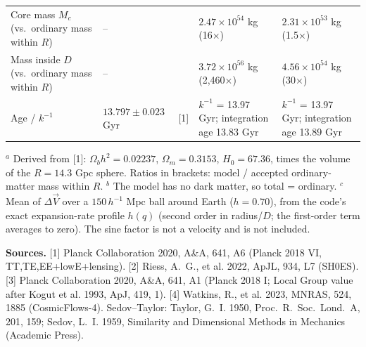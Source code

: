 \documentclass[10pt]{article}
\begin{document}
{\begin{center}
\begin{tabular}{>{\raggedright\arraybackslash}p{4.4cm}>{\raggedright\arraybackslash}p{4.1cm}l>{\raggedright\arraybackslash}p{4.25cm}>{\raggedright\arraybackslash}p{4.25cm}}
Core mass $M_c$ (vs.\ ordinary mass within $R$) & -- &  & $2.47{\times}10^{54}$ kg (16$\times$) & $2.31{\times}10^{53}$ kg (1.5$\times$)\\
Mass inside $D$ (vs.\ ordinary mass within $R$) & -- &  & $3.72{\times}10^{56}$ kg (2{,}460$\times$) & $4.56{\times}10^{54}$ kg (30$\times$)\\
Age / $k^{-1}$ & $13.797\pm0.023$ Gyr & [1] & $k^{-1}$ = 13.97 Gyr; integration age 13.83 Gyr & $k^{-1}$ = 13.97 Gyr; integration age 13.89 Gyr\\
\bottomrule
\end{tabular}\end{center}
\vspace{-3pt}
{\footnotesize $^a$ Derived from [1]: $\Omega_b h^2=0.02237$, $\Omega_m=0.3153$, $H_0=67.36$, times the volume of the $R=14.3$ Gpc sphere. Ratios in brackets: model / accepted ordinary-matter mass within $R$. $^b$ The model has no dark matter, so total = ordinary. $^c$ Mean of $\Delta\vec V$ over a $150\,h^{-1}$ Mpc ball around Earth ($h=0.70$), from the code's exact expansion-rate profile $h(q)$ (second order in radius/$D$; the first-order term averages to zero). The sine factor is not a velocity and is not included.

\textbf{Sources.} [1] Planck Collaboration 2020, A\&A, 641, A6 (Planck 2018 VI, TT,TE,EE+lowE+lensing). [2] Riess, A.~G., et al. 2022, ApJL, 934, L7 (SH0ES). [3] Planck Collaboration 2020, A\&A, 641, A1 (Planck 2018 I; Local Group value after Kogut et al. 1993, ApJ, 419, 1). [4] Watkins, R., et al. 2023, MNRAS, 524, 1885 (CosmicFlows-4). Sedov--Taylor: Taylor, G.~I. 1950, Proc.\ R.\ Soc.\ Lond.\ A, 201, 159; Sedov, L.~I. 1959, Similarity and Dimensional Methods in Mechanics (Academic Press).}

}
\end{document}
